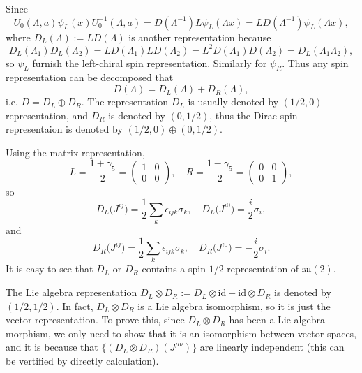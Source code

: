 \documentclass[10pt]{article}
\begin{document}
Since
\[
	U_0(\Lambda,a)\psi_L(x)U_0^{-1}(\Lambda,a)=D(\Lambda^{-1})L\psi_L(\Lambda x)=LD(\Lambda^{-1})\psi_L(\Lambda x),
\]
where $D_L(\Lambda):=LD(\Lambda)$ is another representation because
\[
	D_L(\Lambda_1)D_L(\Lambda_2)=LD(\Lambda_1)LD(\Lambda_2)=L^2D(\Lambda_1)D(\Lambda_2)=D_L(\Lambda_1\Lambda_2),
\]
so $\psi_L$ furnish the left-chiral spin representation. Similarly for $\psi_R$. Thus any spin representation can be decomposed that
\[
	D(\Lambda)=D_L(\Lambda)+D_R(\Lambda),
\]
i.e. $D=D_L\oplus D_R$. The representation $D_L$ is usually denoted by $(1/2,0)$ representation, and $D_R$ is denoted by $(0,1/2)$, thus the Dirac spin representaion is denoted by $(1/2,0)\oplus (0,1/2)$.

Using the matrix representation,
\[
	L=\frac{1+\gamma_5}{2}=\begin{pmatrix}
		1&0\\
		0&0
	\end{pmatrix},\quad R=\frac{1-\gamma_5}{2}=\begin{pmatrix}
		0&0\\
		0&1
	\end{pmatrix},
\]
so
\[
	D_L\bigl(J^{ij}\bigr)=\frac{1}{2}\sum_k\epsilon_{ijk}\sigma_k,\quad D_L\bigl(J^{i0}\bigr)=\frac{i}{2}\sigma_i,
\]
and
\[
	D_R\bigl(J^{ij}\bigr)=\frac{1}{2}\sum_k\epsilon_{ijk}\sigma_k,\quad D_R\bigl(J^{i0}\bigr)=-\frac{i}{2}\sigma_i.
\]
It is easy to see that $D_L$ or $D_R$ contains a spin-$1/2$ representation of $\mathfrak{su}(2)$.

The Lie algebra representation $D_L\otimes D_R:=D_L\otimes \mathrm{id}+\mathrm{id} \otimes D_R$ is denoted by $(1/2,1/2)$. In fact, $D_L\otimes D_R$ is a Lie algebra isomorphism, so it is just the vector representation. To prove this, since $D_L\otimes D_R$ has been a Lie algebra morphism, we only need to show that it is an isomorphism between vector spaces, and it is because that $\{(D_L\otimes D_R)(J^{\mu\nu})\}$ are linearly independent (this can be vertified by directly calculation). 
\end{document}
